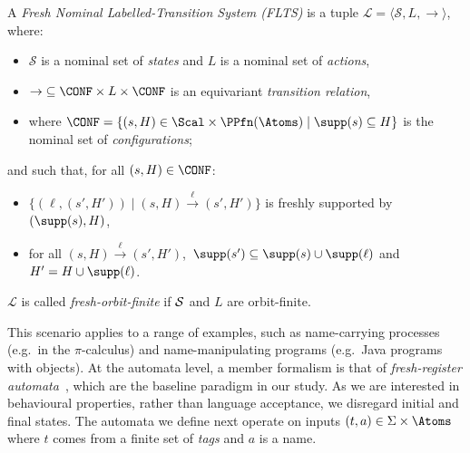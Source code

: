 \begin{definition}
A \emph{Fresh Nominal Labelled-Transition System (FLTS)}
is a tuple $\mathcal{L}=\langle \mathcal{S},L,\rightarrow\rangle$, where:
\begin{itemize}
\item $\mathcal{S}$ is a nominal set of \emph{states}
and $L$ is a nominal set of \emph{actions},
\item    ${\rightarrow}\subseteq \CONF\times L\times\CONF$ is an equivariant \emph{transition relation},
  \item 
  where
 $\CONF=\{(s,H)\in\Scal\times\PPfn(\Atoms)\mid \supp(s)\subseteq H\}$ is the nominal set of \emph{configurations};
\end{itemize}
and such that, for all $(s,H) \in \CONF$:
 \begin{itemize}
     \item 
 $\{(\ell, (s', H'))\mid (s, H) \xrightarrow{\ell} (s', H')\}$ is freshly supported by $(\supp(s),H)$,
\item
for all $(s, H) \xrightarrow{\ell} (s', H')$,\
$\supp(s')\subseteq \supp(s)\cup \supp(\ell)$ and 
$H'=H\cup \supp(\ell)$.
 \end{itemize}
 $\mathcal{L}$ is called \emph{fresh-orbit-finite} if $\cal S$ and $L$ are orbit-finite.
\end{definition}

This scenario applies to a range of examples, such as name-carrying processes (e.g.\ in the $\pi$-calculus) and name-manipulating programs (e.g.\ Java programs with objects). At the automata level, a member formalism is that of \emph{fresh-register automata}~\cite{fra}, which are the baseline paradigm in our study. As we are interested in behavioural properties, rather than language acceptance, we disregard initial and final states. %
The automata we define next operate on inputs $(t,a)\in\Sigma\times\Atoms$ where $t$ comes from a finite set of \emph{tags} and $a$ is a name.  

